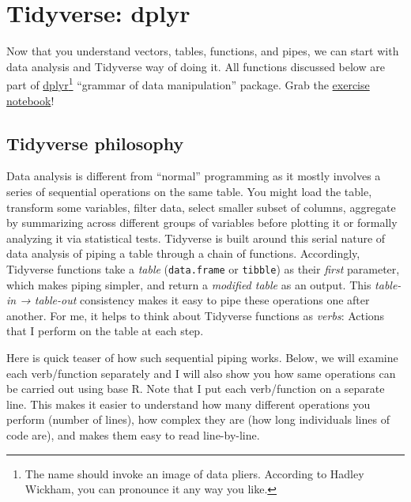 \documentclass[
]{book}
\begin{document}
\hypertarget{dplyr}{%
\chapter{Tidyverse: dplyr}\label{dplyr}}

Now that you understand vectors, tables, functions, and pipes, we can start with data analysis and Tidyverse way of doing it. All functions discussed below are part of \href{https://dplyr.tidyverse.org/}{dplyr}\footnote{The name should invoke an image of data pliers. According to Hadley Wickham, you can pronounce it any way you like.} ``grammar of data manipulation'' package. Grab the \href{notebooks/Seminar\%2006\%20-\%20dplyr.Rmd}{exercise notebook}!

\hypertarget{tidyverse-philosophy}{%
\section{Tidyverse philosophy}\label{tidyverse-philosophy}}

Data analysis is different from ``normal'' programming as it mostly involves a series of sequential operations on the same table. You might load the table, transform some variables, filter data, select smaller subset of columns, aggregate by summarizing across different groups of variables before plotting it or formally analyzing it via statistical tests. Tidyverse is built around this serial nature of data analysis of piping a table through a chain of functions. Accordingly, Tidyverse functions take a \emph{table} (\texttt{data.frame} or \texttt{tibble}) as their \emph{first} parameter, which makes piping simpler, and return a \emph{modified table} as an output. This \emph{table-in → table-out} consistency makes it easy to pipe these operations one after another. For me, it helps to think about Tidyverse functions as \emph{verbs}: Actions that I perform on the table at each step.

Here is quick teaser of how such sequential piping works. Below, we will examine each verb/function separately and I will also show you how same operations can be carried out using base R. Note that I put each verb/function on a separate line. This makes it easier to understand how many different operations you perform (number of lines), how complex they are (how long individuals lines of code are), and makes them easy to read line-by-line.
\end{document}
